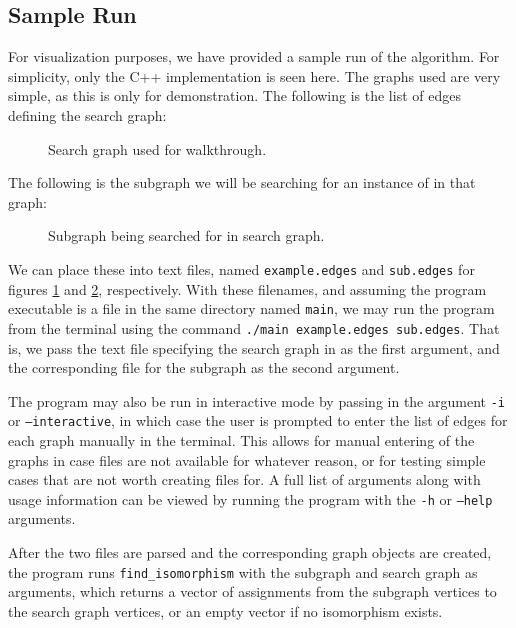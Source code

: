 \documentclass{article}
\begin{document}
  \subsection{Sample Run}

  For visualization purposes, we have provided a sample run of the algorithm. For simplicity, only the C++ implementation is seen here. The graphs used are very simple, as this is only for demonstration. The following is the list of edges defining the search graph:

  \setcounter{figure}{0}
  \begin{figure}[H]
    \centering
    
    \caption{Search graph used for walkthrough.}
    \label{ls:toysearch}
  \end{figure}

  The following is the subgraph we will be searching for an instance of in that graph:

  \begin{figure}[H]
    \centering
    
    \caption{Subgraph being searched for in search graph.}
    \label{ls:toysub}
  \end{figure}

  We can place these into text files, named \texttt{example.edges} and \texttt{sub.edges} for figures \ref{ls:toysearch} and \ref{ls:toysub}, respectively. With these filenames, and assuming the program executable is a file in the same directory named \texttt{main}, we may run the program from the terminal using the command \texttt{./main example.edges sub.edges}. That is, we pass the text file specifying the search graph in as the first argument, and the corresponding file for the subgraph as the second argument.

  The program may also be run in interactive mode by passing in the argument \texttt{-i} or \texttt{--interactive}, in which case the user is prompted to enter the list of edges for each graph manually in the terminal. This allows for manual entering of the graphs in case files are not available for whatever reason, or for testing simple cases that are not worth creating files for. A full list of arguments along with usage information can be viewed by running the program with the \texttt{-h} or \texttt{--help} arguments. 

  After the two files are parsed and the corresponding graph objects are created, the program runs \texttt{find\_isomorphism} with the subgraph and search graph as arguments, which returns a vector of assignments from the subgraph vertices to the search graph vertices, or an empty vector if no isomorphism exists.
\end{document}
